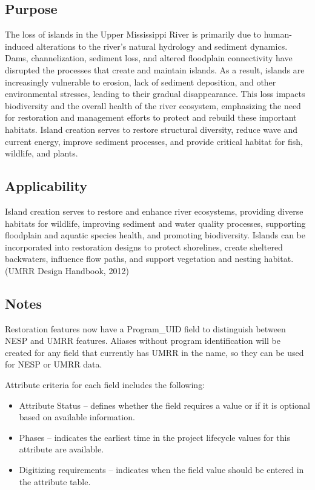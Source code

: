 \documentclass[
  letterpaper,
  DIV=11,
  numbers=noendperiod]{scrreprt}
\providecommand{\tightlist}{%
  \setlength{\itemsep}{0pt}\setlength{\parskip}{0pt}}
\begin{document}
\subsection{Purpose}\label{purpose-9}

The loss of islands in the Upper Mississippi River is primarily due to
human-induced alterations to the river's natural hydrology and sediment
dynamics. Dams, channelization, sediment loss, and altered floodplain
connectivity have disrupted the processes that create and maintain
islands. As a result, islands are increasingly vulnerable to erosion,
lack of sediment deposition, and other environmental stresses, leading
to their gradual disappearance. This loss impacts biodiversity and the
overall health of the river ecosystem, emphasizing the need for
restoration and management efforts to protect and rebuild these
important habitats. Island creation serves to restore structural
diversity, reduce wave and current energy, improve sediment processes,
and provide critical habitat for fish, wildlife, and plants.

\subsection{Applicability}\label{applicability-7}

Island creation serves to restore and enhance river ecosystems,
providing diverse habitats for wildlife, improving sediment and water
quality processes, supporting floodplain and aquatic species health, and
promoting biodiversity. Islands can be incorporated into restoration
designs to protect shorelines, create sheltered backwaters, influence
flow paths, and support vegetation and nesting habitat. (UMRR Design
Handbook, 2012)

\subsection{Notes}\label{notes-9}

Restoration features now have a Program\_UID field to distinguish
between NESP and UMRR features. Aliases without program identification
will be created for any field that currently has UMRR in the name, so
they can be used for NESP or UMRR data.

Attribute criteria for each field includes the following:

\begin{itemize}
\tightlist
\item
  Attribute Status -- defines whether the field requires a value or if
  it is optional based on available information.
\item
  Phases -- indicates the earliest time in the project lifecycle values
  for this attribute are available.
\item
  Digitizing requirements -- indicates when the field value should be
  entered in the attribute table.
\end{itemize}
\end{document}

